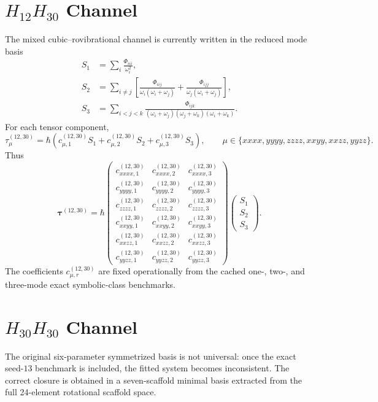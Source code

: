 \documentclass[11pt]{article}
\begin{document}
\section{$H_{12}H_{30}$ Channel}
The mixed cubic--rovibrational channel is currently written in the reduced mode basis
\begin{align}
S_1 &= \sum_i \frac{\Phi_{iii}}{\omega_i^2}, \\
S_2 &= \sum_{i\neq j}
\left[
\frac{\Phi_{iij}}{\omega_i(\omega_i+\omega_j)} +
\frac{\Phi_{ijj}}{\omega_j(\omega_i+\omega_j)}
\right], \\
S_3 &= \sum_{i<j<k}
\frac{\Phi_{ijk}}{(\omega_i+\omega_j)(\omega_j+\omega_k)(\omega_i+\omega_k)}.
\end{align}
For each tensor component,
\begin{equation}
\tau^{(12,30)}_\mu = \hbar\left(
 c^{(12,30)}_{\mu,1} S_1 +
 c^{(12,30)}_{\mu,2} S_2 +
 c^{(12,30)}_{\mu,3} S_3
\right),
\qquad
\mu \in \{xxxx,yyyy,zzzz,xxyy,xxzz,yyzz\}.
\end{equation}
Thus
\begin{equation}
\bm{\tau}^{(12,30)} = \hbar
\begin{pmatrix}
 c^{(12,30)}_{xxxx,1} & c^{(12,30)}_{xxxx,2} & c^{(12,30)}_{xxxx,3} \\
 c^{(12,30)}_{yyyy,1} & c^{(12,30)}_{yyyy,2} & c^{(12,30)}_{yyyy,3} \\
 c^{(12,30)}_{zzzz,1} & c^{(12,30)}_{zzzz,2} & c^{(12,30)}_{zzzz,3} \\
 c^{(12,30)}_{xxyy,1} & c^{(12,30)}_{xxyy,2} & c^{(12,30)}_{xxyy,3} \\
 c^{(12,30)}_{xxzz,1} & c^{(12,30)}_{xxzz,2} & c^{(12,30)}_{xxzz,3} \\
 c^{(12,30)}_{yyzz,1} & c^{(12,30)}_{yyzz,2} & c^{(12,30)}_{yyzz,3}
\end{pmatrix}
\begin{pmatrix}
S_1 \\
S_2 \\
S_3
\end{pmatrix}.
\end{equation}
The coefficients $c^{(12,30)}_{\mu,r}$ are fixed operationally from the cached
one-, two-, and three-mode exact symbolic-class benchmarks.

\section{$H_{30}H_{30}$ Channel}
The original six-parameter symmetrized basis is not universal: once the exact
seed-$13$ benchmark is included, the fitted system becomes inconsistent.
The correct closure is obtained in a seven-scaffold minimal basis extracted from
the full 24-element rotational scaffold space.
\end{document}
